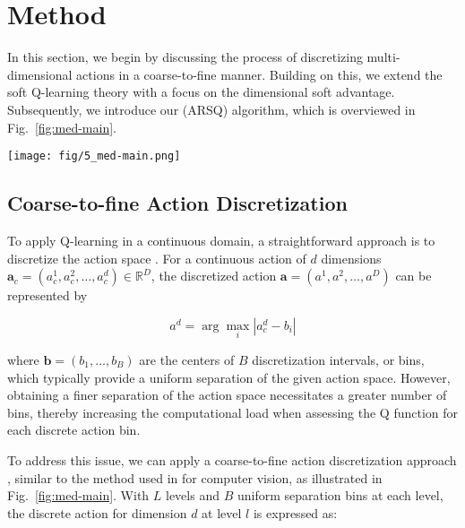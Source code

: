 \section{Method}

In this section, we begin by discussing the process of discretizing multi-dimensional actions in a coarse-to-fine manner. 
Building on this, we extend the soft Q-learning theory with a focus on the dimensional soft advantage. 
Subsequently, we introduce our \arsq (ARSQ) algorithm, which is overviewed in Fig.~\ref{fig:med-main}.

\begin{figure*}[ht]
    \centering
    \texttt{[image: fig/5\_med-main.png]}
    \vspace{-2em}
    \caption{The ARSQ algorithm. The action space is discretized using a coarse-to-fine approach. By predicting dimensional soft advantages, ARSQ generates actions in an auto-regressive manner within a single decision-making step.}
    \label{fig:med-main}
\end{figure*}

\subsection{Coarse-to-fine Action Discretization}
\label{sec:med-coarse}

To apply Q-learning \cite{NatureDQN} in a continuous domain, a straightforward approach is to discretize the action space \cite{DiscretePPO, CQN}. 
For a continuous action of $d$ dimensions $\mathbf{a}_c = (a_c^1, a_c^2, \ldots, a_c^d) \in \mathbb{R}^D$, the discretized action $\mathbf{a} = (a^1, a^2, \ldots, a^D)$ can be represented by

\begin{equation}
    a^d = \arg \max_i | a_c^d - b_i |
\end{equation}

where $\mathbf{b} = (b_1, \ldots, b_B)$ are the centers of $B$ discretization intervals, or bins, which typically provide a uniform separation of the given action space.
However, obtaining a finer separation of the action space necessitates a greater number of bins, thereby increasing the computational load when assessing the Q function for each discrete action bin.

To address this issue, we can apply a coarse-to-fine action discretization approach \cite{CQN}, similar to the method used in \cite{HD-CNN} for computer vision, as illustrated in Fig.~\ref{fig:med-main}. 
With $L$ levels and $B$ uniform separation bins at each level, the discrete action for dimension $d$ at level $l$ is expressed as:

